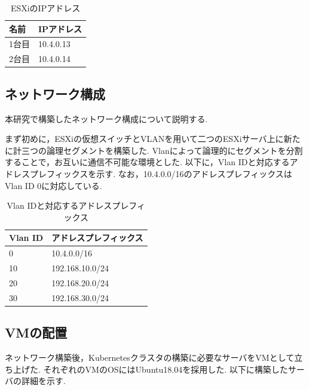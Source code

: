 \begin{table}[htb]
  \begin{center}
    \caption{ESXiのIPアドレス}
    \begin{tabular}{|l|l|} \hline
      名前 & IPアドレス \\ \hline
      1台目 & 10.4.0.13 \\ \hline
      2台目 & 10.4.0.14 \\ \hline
    \end{tabular}
  \end{center}
\end{table}

\subsection{ネットワーク構成}
\label{implementation:network-environment}

本研究で構築したネットワーク構成について説明する.

まず初めに，ESXiの仮想スイッチとVLANを用いて二つのESXiサーバ上に新たに計三つの論理セグメントを構築した.
Vlanによって論理的にセグメントを分割することで，お互いに通信不可能な環境とした.
以下に，Vlan IDと対応するアドレスプレフィックスを示す.
なお，10.4.0.0/16のアドレスプレフィックスはVlan ID 0に対応している.

\begin{table}[htb]
  \begin{center}
    \caption{Vlan IDと対応するアドレスプレフィックス}
    \begin{tabular}{|l|l|} \hline
      Vlan ID & アドレスプレフィックス \\ \hline
      0 & 10.4.0.0/16 \\ \hline
      10 & 192.168.10.0/24 \\ \hline
      20 & 192.168.20.0/24 \\ \hline
      30 & 192.168.30.0/24 \\ \hline
    \end{tabular}
  \end{center}
\end{table}

\subsection{VMの配置}

ネットワーク構築後，Kubernetesクラスタの構築に必要なサーバをVMとして立ち上げた.
それぞれのVMのOSにはUbuntu18.04を採用した.
以下に構築したサーバの詳細を示す.

